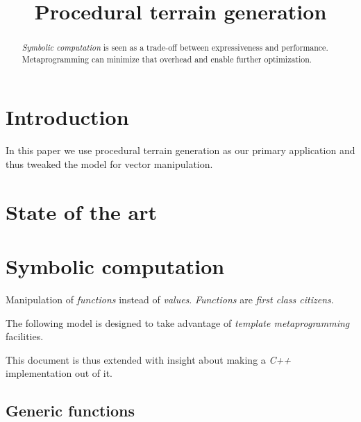 \documentclass[a4paper]{article}
\title{Procedural terrain generation}
\begin{document}
\maketitle
% 
\begin{abstract}

\textit{Symbolic computation} is seen as a trade-off between expressiveness and performance.
Metaprogramming can minimize that overhead and enable further optimization. 


\end{abstract}


\section{Introduction}

In this paper we use procedural terrain generation as our primary application and thus tweaked the model for vector manipulation.

\section{State of the art}

\section{Symbolic computation}

Manipulation of \textit{functions} instead of \textit{values}.
\textit{Functions} are \textit{first class citizens}.

The following model is designed to take advantage of \textit{template metaprogramming} facilities. 

\begin{mdframed}
This document is thus extended with insight about making a \textit{C++} implementation out of it.
\end{mdframed}

\subsection{Generic functions}
\end{document}

